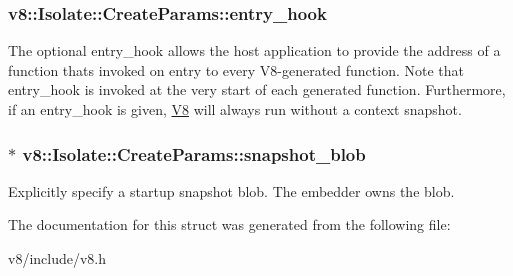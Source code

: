 \subsubsection[{\texorpdfstring{entry\+\_\+hook}{entry_hook}}]{ v8\+::\+Isolate\+::\+Create\+Params\+::entry\+\_\+hook}\hypertarget{structv8_1_1Isolate_1_1CreateParams_aa7aa18bbe2d86713e5b074a93b38dc60}{}\label{structv8_1_1Isolate_1_1CreateParams_aa7aa18bbe2d86713e5b074a93b38dc60}
The optional entry\+\_\+hook allows the host application to provide the address of a function that\textquotesingle{}s invoked on entry to every V8-\/generated function. Note that entry\+\_\+hook is invoked at the very start of each generated function. Furthermore, if an entry\+\_\+hook is given, \hyperlink{classv8_1_1V8}{V8} will always run without a context snapshot. 
\subsubsection[{\texorpdfstring{snapshot\+\_\+blob}{snapshot_blob}}]{$\ast$ v8\+::\+Isolate\+::\+Create\+Params\+::snapshot\+\_\+blob}\hypertarget{structv8_1_1Isolate_1_1CreateParams_a25d38476e4dec79ae96c59292eee4a64}{}\label{structv8_1_1Isolate_1_1CreateParams_a25d38476e4dec79ae96c59292eee4a64}
Explicitly specify a startup snapshot blob. The embedder owns the blob. 

The documentation for this struct was generated from the following file\+:\begin{DoxyCompactItemize}
\item 
v8/include/v8.\+h\end{DoxyCompactItemize}
